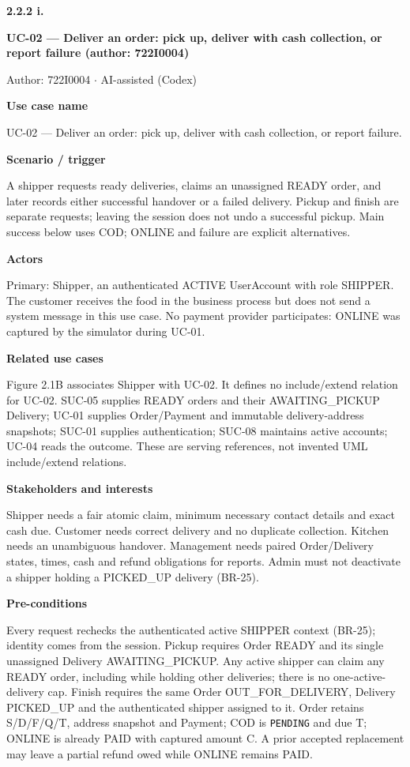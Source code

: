 \textbf{2.2.2 i.}\par
\textbf{UC-02 --- Deliver an order: pick up, deliver with cash collection, or report failure (author: 722I0004)}

Author: 722I0004 \ensuremath{\cdot} AI-assisted (Codex)

\textbf{Use case name}

UC-02 --- Deliver an order: pick up, deliver with cash collection, or report failure.

\textbf{Scenario / trigger}

A shipper requests ready deliveries, claims an unassigned READY order, and later records either successful handover or a failed delivery. Pickup and finish are separate requests; leaving the session does not undo a successful pickup. Main success below uses COD; ONLINE and failure are explicit alternatives.

\textbf{Actors}

Primary: Shipper, an authenticated ACTIVE UserAccount with role SHIPPER. The customer receives the food in the business process but does not send a system message in this use case. No payment provider participates: ONLINE was captured by the simulator during UC-01.

\textbf{Related use cases}

Figure 2.1B associates Shipper with UC-02. It defines no include/extend relation for UC-02. SUC-05 supplies READY orders and their AWAITING\_PICKUP Delivery; UC-01 supplies Order/Payment and immutable delivery-address snapshots; SUC-01 supplies authentication; SUC-08 maintains active accounts; UC-04 reads the outcome. These are serving references, not invented UML include/extend relations.

\textbf{Stakeholders and interests}

Shipper needs a fair atomic claim, minimum necessary contact details and exact cash due. Customer needs correct delivery and no duplicate collection. Kitchen needs an unambiguous handover. Management needs paired Order/Delivery states, times, cash and refund obligations for reports. Admin must not deactivate a shipper holding a PICKED\_UP delivery (BR-25).

\textbf{Pre-conditions}

Every request rechecks the authenticated active SHIPPER context (BR-25); identity comes from the session. Pickup requires Order READY and its single unassigned Delivery AWAITING\_PICKUP. Any active shipper can claim any READY order, including while holding other deliveries; there is no one-active-delivery cap. Finish requires the same Order OUT\_FOR\_DELIVERY, Delivery PICKED\_UP and the authenticated shipper assigned to it. Order retains S/D/F/Q/T, address snapshot and Payment; COD is \texttt{PENDING} and due T; ONLINE is already PAID with captured amount C. A prior accepted replacement may leave a partial refund owed while ONLINE remains PAID.

